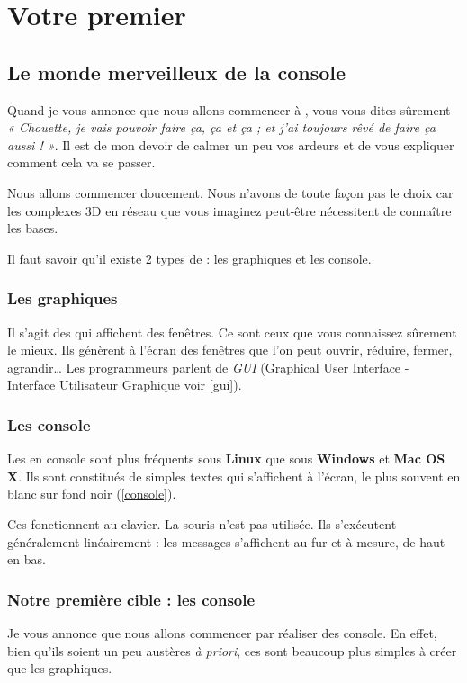 \chapter{Votre premier \prog}
\section{Le monde merveilleux de la console}
Quand je vous annonce que nous allons commencer à \progrer, vous vous dites sûrement\textit{ « Chouette, je vais pouvoir faire ça, ça et ça ; et j'ai toujours rêvé de faire ça aussi ! »}. Il est de mon devoir de calmer un peu vos ardeurs et de vous expliquer comment cela va se passer.

Nous allons commencer doucement. Nous n'avons de toute façon pas le choix car les \progs complexes 3D en réseau que vous imaginez peut-être nécessitent de connaître les bases.

Il faut savoir qu'il existe 2 types de \progs : les \progs graphiques et les \progs console.
\subsection{Les \progs graphiques}
Il s'agit des \progs qui affichent des fenêtres. Ce sont ceux que vous connaissez sûrement le mieux. Ils génèrent à l'écran des fenêtres que l'on peut ouvrir, réduire, fermer, agrandir…
Les programmeurs parlent de \emph{GUI} (Graphical User Interface - Interface Utilisateur Graphique voir \fig \ref{gui}). 


\subsection{Les \progs console}
Les \progs en console sont plus fréquents sous \textbf{Linux} que sous \textbf{Windows} et \textbf{Mac OS X}. Ils sont constitués de simples textes qui s'affichent à l'écran, le plus souvent en blanc sur fond noir (\fig \ref{console}).


Ces \progs fonctionnent au clavier. La souris n'est pas utilisée.
Ils s'exécutent généralement linéairement : les messages s'affichent au fur et à mesure, de haut en bas.
\subsection{Notre première cible : les \progs console}
Je vous annonce que nous allons commencer par réaliser des \progs console. En effet, bien qu'ils soient un peu austères \textit{à priori}, ces \progs sont beaucoup plus simples à créer que les \progs graphiques.
